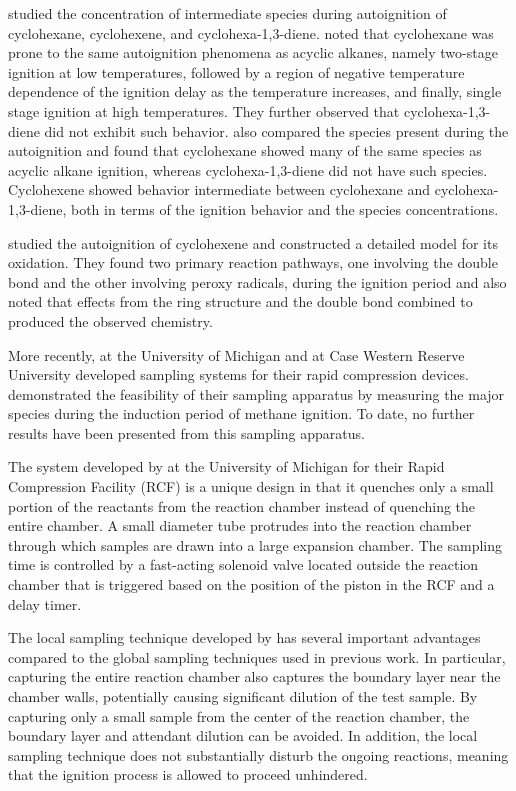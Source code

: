 \documentclass[../main.tex]{subfiles}
\begin{document}
\textcite{Lemaire2001, Ribaucour2002} studied the concentration of
intermediate species during autoignition of cyclohexane, cyclohexene,
and cyclohexa-1,3-diene. \textcite{Lemaire2001} noted that cyclohexane
was prone to the same autoignition phenomena as acyclic alkanes, namely
two-stage ignition at low temperatures, followed by a region of negative
temperature dependence of the ignition delay as the temperature increases,
and finally, single stage ignition at high temperatures. They further
observed that cyclohexa-1,3-diene did not exhibit such behavior.
\textcite{Lemaire2001} also compared the species present during the
autoignition and found that cyclohexane showed many of the same species
as acyclic alkane ignition, whereas cyclohexa-1,3-diene did not have
such species. Cyclohexene showed behavior intermediate between
cyclohexane and cyclohexa-1,3-diene, both in terms of the ignition behavior
and the species concentrations.

\textcite{Ribaucour2002} studied the autoignition of cyclohexene and
constructed a detailed model for its oxidation. They found two primary
reaction pathways, one involving the double bond and the other involving
peroxy radicals, during the ignition period and also noted that effects
from the ring structure and the double bond combined to produced the
observed chemistry.

More recently, \textcite{He2005a} at the University of Michigan and
\textcite{Mittal2006a} at Case Western Reserve University developed
sampling systems for their rapid compression devices. \textcite{Mittal2007}
demonstrated the feasibility of their sampling apparatus by measuring
the major species during the induction period of methane ignition. To date,
no further results have been presented from this sampling apparatus.

The system developed by \textcite{He2005a} at the University of Michigan
for their Rapid Compression Facility (RCF) is a unique design in that it
quenches only a small portion of the reactants from the reaction chamber
instead of quenching the entire chamber. A small diameter tube protrudes
into the reaction chamber through which samples are drawn into a large
expansion chamber. The sampling time is controlled by a fast-acting
solenoid valve located outside the reaction chamber that is triggered
based on the position of the piston in the RCF and a delay timer.

The local sampling technique developed by \textcite{He2005a} has several
important advantages compared to the global sampling techniques used
in previous work. In particular, capturing the entire reaction chamber
also captures the boundary layer near the chamber walls, potentially
causing significant dilution of the test sample. By capturing only a
small sample from the center of the reaction chamber, the boundary layer
and attendant dilution can be avoided. In addition, the local sampling
technique does not substantially disturb the ongoing reactions,
meaning that the ignition process is allowed to proceed unhindered.
\end{document}
